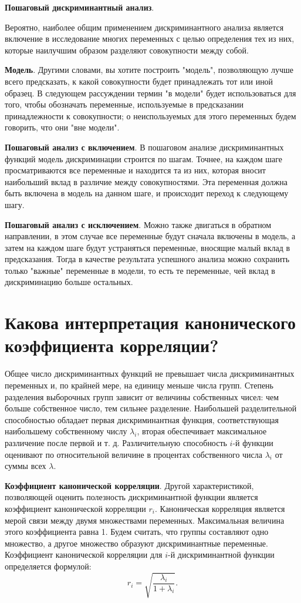 \documentclass[a4paper, 12pt]{article}
\begin{document}
\textbf{Пошаговый дискриминантный анализ}.

Вероятно, наиболее общим применением дискриминантного анализа является включение в исследование многих переменных с целью определения тех из них, которые наилучшим образом разделяют совокупности между собой.

\textbf{Модель}. Другими словами, вы хотите построить "модель", позволяющую лучше всего предсказать, к какой совокупности будет принадлежать тот или иной образец. В следующем рассуждении термин "в модели" будет использоваться для того, чтобы обозначать переменные, используемые в предсказании принадлежности к совокупности; о неиспользуемых для этого переменных будем говорить, что они "вне модели".

\textbf{Пошаговый анализ с включением}. В пошаговом анализе дискриминантных функций модель дискриминации строится по шагам. Точнее, на каждом шаге просматриваются все переменные и находится та из них, которая вносит наибольший вклад в различие между совокупностями. Эта переменная должна быть включена в модель на данном шаге, и происходит переход к следующему шагу.

\textbf{Пошаговый анализ с исключением}. Можно также двигаться в обратном направлении, в этом случае все переменные будут сначала включены в модель, а затем на каждом шаге будут устраняться переменные, вносящие малый вклад в предсказания. Тогда в качестве результата успешного анализа можно сохранить только "важные" переменные в модели, то есть те переменные, чей вклад в дискриминацию больше остальных.

\section{Какова интерпретация канонического коэффициента корреляции?}
Общее число дискриминантных функций не превышает числа дискриминантных переменных и, по крайней мере, на единицу меньше числа групп. Степень разделения выборочных групп зависит от величины собственных чисел: чем больше собственное число, тем сильнее разделение. Наибольшей разделительной способностью обладает первая дискриминантная функция, соответствующая наибольшему собственному числу $\lambda_i$, вторая обеспечивает максимальное различение после первой и т. д. Различительную способность $i$-й функции оценивают по относительной величине в процентах собственного числа  $\lambda_i$ от суммы всех  $\lambda$.

\textbf{Коэффициент канонической корреляции}. Другой характеристикой, позволяющей оценить полезность дискриминантной функции является коэффициент канонической корреляции  $r_i$. Каноническая корреляция является мерой связи между двумя множествами переменных. Максимальная величина этого коэффициента равна 1. Будем считать, что группы составляют одно множество, а другое множество образуют дискриминантные переменные. Коэффициент канонической корреляции для $i$-й дискриминантной функции определяется формулой: $$r_i = \sqrt{\dfrac{\lambda_i}{1+\lambda_i}}.$$
\end{document}
